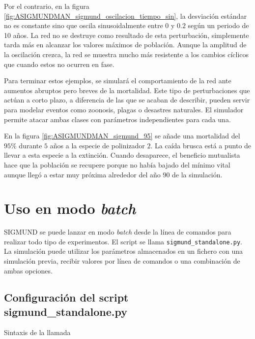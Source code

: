 Por el contrario, en la figura \ref{fig:ASIGMUNDMAN_sigmund_oscilacion_tiempo_sin}, la desviación estándar no es constante sino que oscila sinusoidalmente entre $0$ y $0.2$ según un periodo de 10 años. La red no se destruye como resultado de esta perturbación, simplemente tarda más en alcanzar los valores máximos de población. Aunque la amplitud de la oscilación crezca, la red se muestra mucho más resistente a los cambios cíclicos que cuando estos no ocurren en fase.

Para terminar estos ejemplos, se simulará el comportamiento de la red ante aumentos abruptos pero breves de la mortalidad. Este tipo de perturbaciones que actúan a corto plazo, a diferencia de las que se acaban de describir, pueden servir para modelar eventos como zoonosis, plagas o desastres naturales. El simulador permite atacar ambas clases con parámetros independientes para cada una.

En la figura \ref{fig:ASIGMUNDMAN_sigmund_95} se añade una mortalidad del $95\%$ durante $5$ años a la especie de polinizador $2$. La caída brusca está a punto de llevar a esta especie a la extinción. Cuando desaparece, el beneficio mutualista hace que la población se recupere porque no había bajado del mínimo vital aunque llegó a estar muy próxima alrededor del año $90$ de la simulación.

\section{Uso en modo \textit{batch}}

SIGMUND se puede lanzar en modo \textit{batch} desde la línea de comandos para realizar todo tipo de experimentos. El script se llama \texttt{sigmund\_standalone.py}. La simulación puede utilizar los parámetros almacenados en un fichero con una simulación previa, recibir
valores por línea de comandos o una combinación de ambas opciones.

\subsection{Configuración del script sigmund\_standalone.py}

\noindent Sintaxis de la llamada

